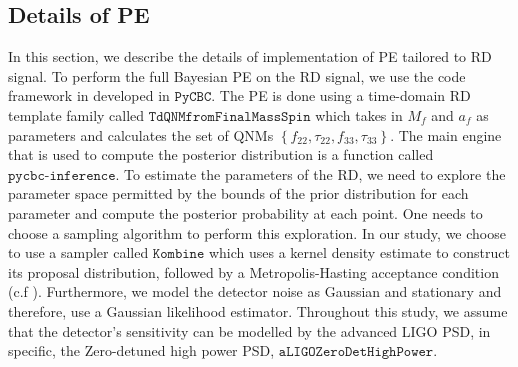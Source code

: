 \subsection{Details of PE}
\label{sec:PE-details}

In this section, we describe the details of implementation of PE tailored to RD signal. To perform the full Bayesian PE on the RD signal, we use the code framework in developed in $\texttt{PyCBC}$. The PE is done using a time-domain RD template family called $\texttt{TdQNMfromFinalMassSpin}$ which takes in $M_{f}$ and $a_{f}$ as parameters and calculates the set of QNMs $\left\lbrace f_{22}, \tau_{22}, f_{33}, \tau_{33} \right\rbrace$.  The main engine that is used to compute the posterior distribution is a function called $\texttt{pycbc-inference}$. To estimate the parameters of the RD, we need to explore the parameter space permitted by the bounds of the prior distribution for each parameter and compute the posterior probability at each point. One needs to choose a sampling algorithm to perform this exploration. In our study, we choose to use a sampler called $\texttt{Kombine}$ which uses a kernel density estimate to construct its proposal distribution, followed by a Metropolis-Hasting acceptance condition (c.f \cite{10.2307/2684568}). Furthermore, we model the detector noise as Gaussian and stationary and therefore, use a Gaussian likelihood estimator. Throughout this study, we assume that the detector's sensitivity can be modelled by the advanced LIGO PSD, in specific, the Zero-detuned high power PSD, $\texttt{aLIGOZeroDetHighPower}$.


